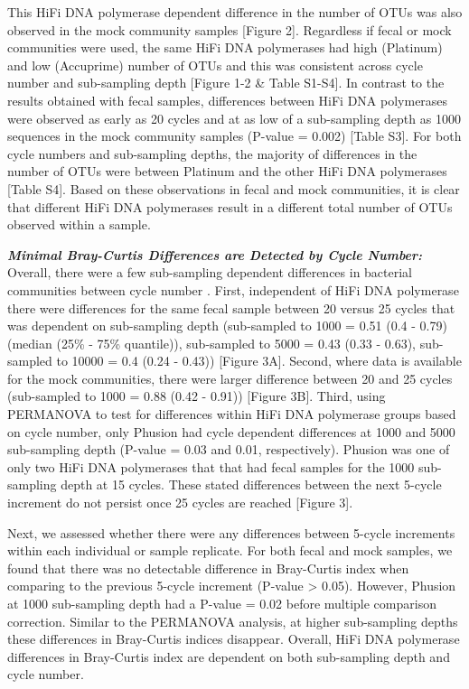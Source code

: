 \documentclass[12pt,]{article}
\begin{document}
This HiFi DNA polymerase dependent difference in the number of OTUs was
also observed in the mock community samples {[}Figure 2{]}. Regardless
if fecal or mock communities were used, the same HiFi DNA polymerases
had high (Platinum) and low (Accuprime) number of OTUs and this was
consistent across cycle number and sub-sampling depth {[}Figure 1-2 \&
Table S1-S4{]}. In contrast to the results obtained with fecal samples,
differences between HiFi DNA polymerases were observed as early as 20
cycles and at as low of a sub-sampling depth as 1000 sequences in the
mock community samples (P-value = 0.002) {[}Table S3{]}. For both cycle
numbers and sub-sampling depths, the majority of differences in the
number of OTUs were between Platinum and the other HiFi DNA polymerases
{[}Table S4{]}. Based on these observations in fecal and mock
communities, it is clear that different HiFi DNA polymerases result in a
different total number of OTUs observed within a sample.

\textbf{\emph{Minimal Bray-Curtis Differences are Detected by Cycle
Number:}} Overall, there were a few sub-sampling dependent differences
in bacterial communities between cycle number . First, independent of
HiFi DNA polymerase there were differences for the same fecal sample
between 20 versus 25 cycles that was dependent on sub-sampling depth
(sub-sampled to 1000 = 0.51 (0.4 - 0.79) (median (25\% - 75\%
quantile)), sub-sampled to 5000 = 0.43 (0.33 - 0.63), sub-sampled to
10000 = 0.4 (0.24 - 0.43)) {[}Figure 3A{]}. Second, where data is
available for the mock communities, there were larger difference between
20 and 25 cycles (sub-sampled to 1000 = 0.88 (0.42 - 0.91)) {[}Figure
3B{]}. Third, using PERMANOVA to test for differences within HiFi DNA
polymerase groups based on cycle number, only Phusion had cycle
dependent differences at 1000 and 5000 sub-sampling depth (P-value =
0.03 and 0.01, respectively). Phusion was one of only two HiFi DNA
polymerases that that had fecal samples for the 1000 sub-sampling depth
at 15 cycles. These stated differences between the next 5-cycle
increment do not persist once 25 cycles are reached {[}Figure 3{]}.

Next, we assessed whether there were any differences between 5-cycle
increments within each individual or sample replicate. For both fecal
and mock samples, we found that there was no detectable difference in
Bray-Curtis index when comparing to the previous 5-cycle increment
(P-value \textgreater{} 0.05). However, Phusion at 1000 sub-sampling
depth had a P-value = 0.02 before multiple comparison correction.
Similar to the PERMANOVA analysis, at higher sub-sampling depths these
differences in Bray-Curtis indices disappear. Overall, HiFi DNA
polymerase differences in Bray-Curtis index are dependent on both
sub-sampling depth and cycle number.
\end{document}
